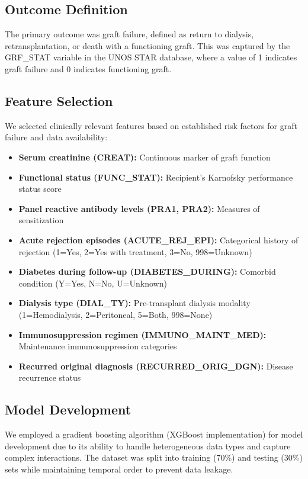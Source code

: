 \documentclass[12pt,a4paper]{article}
\begin{document}
\subsection{Outcome Definition}

The primary outcome was graft failure, defined as return to dialysis, retransplantation, or death with a functioning graft. This was captured by the GRF\_STAT variable in the UNOS STAR database, where a value of 1 indicates graft failure and 0 indicates functioning graft.

\subsection{Feature Selection}

We selected clinically relevant features based on established risk factors for graft failure and data availability:

\begin{itemize}
\item \textbf{Serum creatinine (CREAT):} Continuous marker of graft function
\item \textbf{Functional status (FUNC\_STAT):} Recipient's Karnofsky performance status score
\item \textbf{Panel reactive antibody levels (PRA1, PRA2):} Measures of sensitization
\item \textbf{Acute rejection episodes (ACUTE\_REJ\_EPI):} Categorical history of rejection (1=Yes, 2=Yes with treatment, 3=No, 998=Unknown)
\item \textbf{Diabetes during follow-up (DIABETES\_DURING):} Comorbid condition (Y=Yes, N=No, U=Unknown)
\item \textbf{Dialysis type (DIAL\_TY):} Pre-transplant dialysis modality (1=Hemodialysis, 2=Peritoneal, 5=Both, 998=None)
\item \textbf{Immunosuppression regimen (IMMUNO\_MAINT\_MED):} Maintenance immunosuppression categories
\item \textbf{Recurred original diagnosis (RECURRED\_ORIG\_DGN):} Disease recurrence status
\end{itemize}

\subsection{Model Development}

We employed a gradient boosting algorithm (XGBoost implementation) for model development due to its ability to handle heterogeneous data types and capture complex interactions. The dataset was split into training (70\%) and testing (30\%) sets while maintaining temporal order to prevent data leakage.
\end{document}

